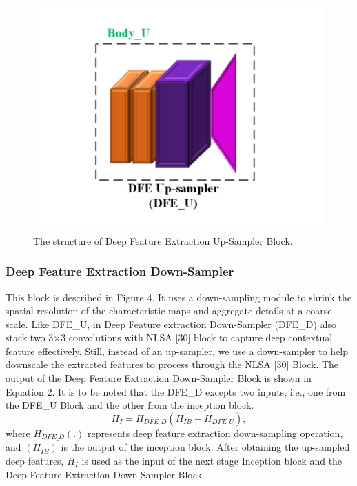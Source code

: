 \documentclass{ieeeaccess}
\begin{document}
\begin{figure}[ht]
  \includegraphics[width=\linewidth]{3FIGURE.pdf}
  \caption{The structure of Deep Feature Extraction Up-Sampler Block.}
  \label{fig:3}
\end{figure}

\subsubsection{Deep Feature Extraction Down-Sampler}

This block is described in Figure 4. It uses a down-sampling module to shrink the spatial resolution of the characteristic maps and aggregate details at a coarse scale. Like  DFE\_U, in Deep Feature extraction Down-Sampler (DFE\_D) also stack two 3$\times$3 convolutions with NLSA [30] block to capture deep contextual feature effectively. Still, instead of an up-sampler, we use a down-sampler to help downscale the extracted features to process through the NLSA [30] Block. The output of the Deep Feature Extraction Down-Sampler Block is shown in Equation 2. 
It is to be noted that the DFE\_D excepts two inputs, i.e., one from the DFE\_U Block and the other from the inception block.
\begin{equation}
{H_{I}}= {H_{DFE\_D}}({H_{IB}} + {H_{DFE\_U}}),
\end{equation}
where ${H_{DFE\_D}}$$(.)$ represents deep feature extraction down-sampling operation, and $({H_{IB}})$ is the output of the inception block. After obtaining the up-sampled deep features, ${H_{I}}$ is used as the input of the next stage Inception block and the Deep Feature Extraction Down-Sampler Block.
\end{document}
